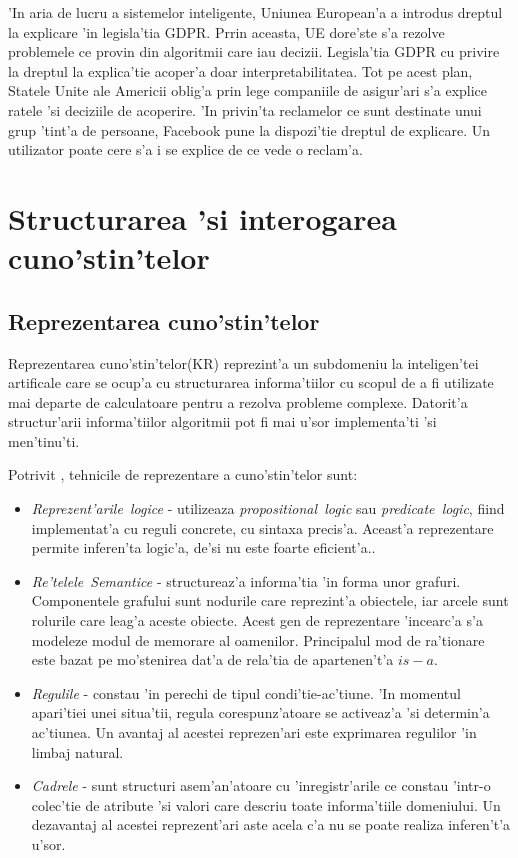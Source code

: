 \documentclass[12pt,a4paper,twoside]{report}
\begin{document}
'In aria de lucru a sistemelor inteligente, Uniunea European'a a introdus dreptul la explicare 'in legisla'tia GDPR. Prrin aceasta, UE dore'ste s'a rezolve problemele ce provin din algoritmii care iau decizii. Legisla'tia GDPR cu privire la dreptul la explica'tie acoper'a doar interpretabilitatea. Tot pe acest plan, Statele Unite ale Americii oblig'a prin lege companiile de asigur'ari s'a explice ratele 'si deciziile de acoperire. 'In privin'ta reclamelor ce sunt destinate unui grup 'tint'a de persoane, Facebook pune la dispozi'tie dreptul de explicare. Un utilizator poate cere s'a i se explice de ce vede o reclam'a.



\section{Structurarea 'si interogarea cuno'stin'telor}


\subsection{Reprezentarea cuno'stin'telor}
\label{sec:rep_Cun}

Reprezentarea cuno'stin'telor(KR) reprezint'a un subdomeniu la inteligen'tei artificale care se ocup'a cu structurarea informa'tiilor cu scopul de a fi utilizate mai departe de calculatoare pentru a rezolva probleme complexe. Datorit'a structur'arii informa'tiilor algoritmii pot fi mai u'sor implementa'ti 'si men'tinu'ti.

Potrivit \cite{SharmaATechniques},\cite{javap_kr} tehnicile de reprezentare a cuno'stin'telor sunt: 

\begin{itemize}
    \item {\it Reprezent'arile\ logice} - utilizeaza {\it propositional\ logic} sau {\it predicate\ logic}, fiind implementat'a cu reguli concrete, cu sintaxa precis'a. Aceast'a reprezentare permite inferen'ta logic'a, de'si nu este foarte eficient'a.. 
    \item {\it Re'telele\ Semantice} - structureaz'a informa'tia  'in forma unor grafuri. Componentele grafului sunt nodurile care reprezint'a obiectele, iar arcele sunt rolurile care leag'a aceste obiecte. Acest gen de reprezentare 'incearc'a s'a modeleze modul de memorare al oamenilor. Principalul mod de ra'tionare este bazat pe mo'stenirea dat'a de rela'tia de apartenen't'a $is-a$.
    \item {\it Regulile} - constau 'in perechi de tipul condi'tie-ac'tiune. 'In momentul apari'tiei unei situa'tii, regula corespunz'atoare se activeaz'a 'si determin'a ac'tiunea. Un avantaj al acestei reprezen'ari este exprimarea regulilor 'in limbaj natural.
    \item {\it Cadrele} - sunt structuri asem'an'atoare cu 'inregistr'arile ce constau 'intr-o colec'tie de atribute 'si valori care descriu toate informa'tiile domeniului. Un dezavantaj al acestei reprezent'ari aste acela c'a nu se poate realiza inferen't'a u'sor.
\end{itemize}
\end{document}
